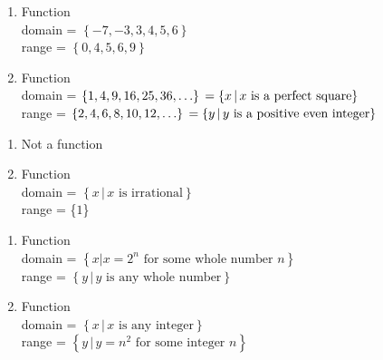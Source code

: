 \begin{multicols}{2}
\begin{enumerate}
\setcounter{enumi}{\value{HW}}

\item  Function \\ domain = $\left\{ -7, -3, 3, 4, 5, 6 \right\}$ \\ range = $\left\{ 0,4,5,6,9 \right\}$


\vfill

\columnbreak

\item  Function \\ domain =   $\left\{ 1, 4, 9, 16, 25, 36, \ldots \right\} \\ = \left\{ x \, | \, \text{$x$ is a perfect square} \right\}$ \\ range =  $\left\{ 2, 4, 6, 8, 10, 12, \ldots \right\} \\ = \left\{ y \, | \, \text{$y$ is a positive even integer} \right\}$

\setcounter{HW}{\value{enumi}}
\end{enumerate}
\end{multicols}

\begin{multicols}{2}
\begin{enumerate}
\setcounter{enumi}{\value{HW}}

\item  Not a function

\vfill

\columnbreak

\item Function \\ domain =  $\left\{ x \, | \, \text{$x$ is irrational}\right\}$ \\ range = \{$1$\}

\setcounter{HW}{\value{enumi}}
\end{enumerate}
\end{multicols}

\begin{multicols}{2}
\begin{enumerate}
\setcounter{enumi}{\value{HW}}

\item Function \\ domain = $\left\{x | \text{$x = 2^{n}$ for some whole number $n$} \right\}$ \\ range = $\left\{y \, | \, \text{$y$ is any whole number}\right\}$

\vfill

\columnbreak

\item Function \\ domain = $\left\{x \, | \, \text{$x$ is any integer}\right\}$ \\ range = $\left\{y \, | \, \text{$y = n^{2}$ for some integer $n$}\right\}$

\setcounter{HW}{\value{enumi}}
\end{enumerate}
\end{multicols}

